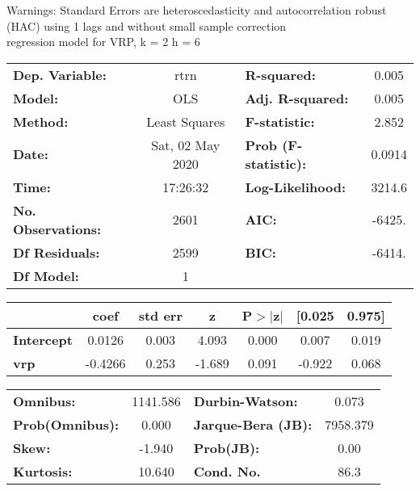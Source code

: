 Warnings: \newline
 [1] Standard Errors are heteroscedasticity and autocorrelation robust (HAC) using 1 lags and without small sample correction\\ 

regression model for VRP, k = 2 h = 6\begin{center}
\begin{tabular}{lclc}
\toprule
\textbf{Dep. Variable:}    &       rtrn       & \textbf{  R-squared:         } &     0.005   \\
\textbf{Model:}            &       OLS        & \textbf{  Adj. R-squared:    } &     0.005   \\
\textbf{Method:}           &  Least Squares   & \textbf{  F-statistic:       } &     2.852   \\
\textbf{Date:}             & Sat, 02 May 2020 & \textbf{  Prob (F-statistic):} &   0.0914    \\
\textbf{Time:}             &     17:26:32     & \textbf{  Log-Likelihood:    } &    3214.6   \\
\textbf{No. Observations:} &        2601      & \textbf{  AIC:               } &    -6425.   \\
\textbf{Df Residuals:}     &        2599      & \textbf{  BIC:               } &    -6414.   \\
\textbf{Df Model:}         &           1      & \textbf{                     } &             \\
\bottomrule
\end{tabular}
\begin{tabular}{lcccccc}
                   & \textbf{coef} & \textbf{std err} & \textbf{z} & \textbf{P$> |$z$|$} & \textbf{[0.025} & \textbf{0.975]}  \\
\midrule
\textbf{Intercept} &       0.0126  &        0.003     &     4.093  &         0.000        &        0.007    &        0.019     \\
\textbf{vrp}       &      -0.4266  &        0.253     &    -1.689  &         0.091        &       -0.922    &        0.068     \\
\bottomrule
\end{tabular}
\begin{tabular}{lclc}
\textbf{Omnibus:}       & 1141.586 & \textbf{  Durbin-Watson:     } &    0.073  \\
\textbf{Prob(Omnibus):} &   0.000  & \textbf{  Jarque-Bera (JB):  } & 7958.379  \\
\textbf{Skew:}          &  -1.940  & \textbf{  Prob(JB):          } &     0.00  \\
\textbf{Kurtosis:}      &  10.640  & \textbf{  Cond. No.          } &     86.3  \\
\bottomrule
\end{tabular}
\end{center}


